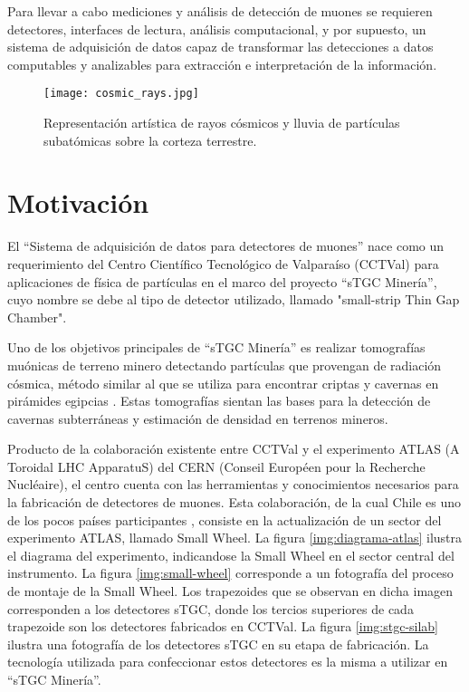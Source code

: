	Para llevar a cabo mediciones y análisis de detección de muones se requieren detectores, interfaces de lectura, análisis computacional, y por supuesto, un sistema de adquisición de datos capaz de  transformar las detecciones a datos computables y analizables para extracción e interpretación de la información.
	
	\begin{figure}[h]
		\centering
		\texttt{[image: cosmic\_rays.jpg]}
		\caption{Representación artística de rayos cósmicos y lluvia de partículas subatómicas sobre la corteza terrestre.}
		\label{img:cosmic-ray}
	\end{figure}
	
	
\section{Motivación}
	El ``Sistema de adquisición de datos para detectores de muones'' nace como un requerimiento del Centro Científico Tecnológico de Valparaíso (CCTVal)  para aplicaciones de física de partículas en el marco del proyecto ``sTGC Minería'', cuyo nombre se debe al tipo de detector utilizado, llamado "small-strip Thin Gap Chamber".
	
	Uno de los objetivos principales de ``sTGC Minería'' es realizar tomografías muónicas de terreno minero detectando partículas que provengan de radiación cósmica, método similar al que se utiliza para encontrar criptas y cavernas en pirámides egipcias \cite{AlvarezSearchPyramids}. Estas tomografías sientan las bases para la detección de cavernas subterráneas y estimación de densidad en terrenos mineros. %

	
	Producto de la colaboración existente entre CCTVal y el experimento ATLAS (A Toroidal LHC ApparatuS) del CERN (Conseil Européen pour la Recherche Nucléaire), el centro  cuenta con las herramientas y conocimientos necesarios para la fabricación de detectores de muones. Esta colaboración, de la cual Chile es uno de los pocos países participantes , consiste en la actualización de un sector del experimento ATLAS, llamado Small Wheel. La figura  \ref{img:diagrama-atlas} ilustra el diagrama del experimento, indicandose la Small Wheel en el sector central del instrumento. La figura \ref{img:small-wheel} corresponde a un fotografía  del proceso de montaje de la Small Wheel. Los trapezoides  que se observan en dicha imagen corresponden a los detectores sTGC, donde los tercios superiores de cada trapezoide son los detectores fabricados en CCTVal. La figura \ref{img:stgc-silab} ilustra una fotografía de los detectores sTGC en su etapa de fabricación. La tecnología utilizada para confeccionar estos detectores es la misma a utilizar en ``sTGC Minería''.
	
